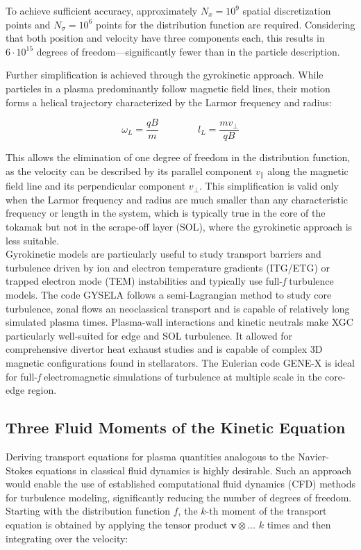 To achieve sufficient accuracy, approximately $N_x = 10^9$ spatial discretization points and $N_\sigma = 10^6$ points for the distribution function are required. Considering that both position and velocity have three components each, this results in $6 \cdot 10^{15}$ degrees of freedom—significantly fewer than in the particle description. \newline

Further simplification is achieved through the gyrokinetic approach. While particles in a plasma predominantly follow magnetic field lines, their motion forms a helical trajectory characterized by the Larmor frequency and radius:

\begin{equation}
	\omega_L = \frac{qB}{m} \qquad\qquad l_L = \frac{mv_\perp}{qB}
\end{equation}

This allows the elimination of one degree of freedom in the distribution function, as the velocity can be described by its parallel component $v_\parallel$ along the magnetic field line and its perpendicular component $v_\perp$. This simplification is valid only when the Larmor frequency and radius are much smaller than any characteristic frequency or length in the system, which is typically true in the core of the tokamak but not in the scrape-off layer (SOL), where the gyrokinetic approach is less suitable. \\

Gyrokinetic models are particularly useful to study transport barriers and turbulence driven by ion and electron temperature gradients (ITG/ETG) or trapped electron mode (TEM) instabilities and typically use full-\textit{f} turbulence models. The code GYSELA\cite{grandgirard2007global,grandgirard20165d} follows a semi-Lagrangian method to study core turbulence, zonal flows an neoclassical transport and is capable of relatively long simulated plasma times. Plasma-wall interactions and kinetic neutrals make XGC\cite{hager2022} particularly well-suited for edge and SOL turbulence. It allowed for comprehensive divertor heat exhaust studies\cite{chang2017gyrokinetic} and is capable of complex 3D magnetic configurations found in stellarators\cite{cole2019verification}. The Eulerian code GENE-X\cite{goerler2011global,michels2021gene} is ideal for full-\textit{f} electromagnetic simulations of turbulence at multiple scale in the core-edge region. 


\subsection{Three Fluid Moments of the Kinetic Equation}
\label{sec:desc_fluidMoments}
Deriving transport equations for plasma quantities analogous to the Navier-Stokes equations in classical fluid dynamics is highly desirable. Such an approach would enable the use of established computational fluid dynamics (CFD) methods for turbulence modeling, significantly reducing the number of degrees of freedom. Starting with the distribution function $f$, the $k$-th moment of the transport equation is obtained by applying the tensor product $\mathbf{v} \otimes \dots$ $k$ times and then integrating over the velocity:

